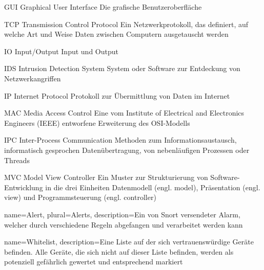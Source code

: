
	{GUI}
	{Graphical User Interface}
	{Die grafische Benutzeroberfläche}

	{TCP}
	{Transmission Control Protocol}
	{Ein Netzwerkprotokoll, das definiert, auf welche Art und Weise Daten zwischen Computern ausgetauscht werden}


	{IO}
	{Input/Output}
	{Input und Output}


	{IDS}
	{Intrusion Detection System}
	{System oder Software zur Entdeckung von Netzwerkangriffen}


	{IP}
	{Internet Protocol}
	{Protokoll zur Übermittlung von Daten im Internet}


	{MAC}
	{Media Access Control}
	{Eine vom Institute of Electrical and Electronics Engineers (IEEE) entworfene Erweiterung des OSI-Modells}


	{IPC}
	{Inter-Process Communication}
	{Methoden zum Informationsaustausch, informatisch gesprochen Datenübertragung, von nebenläufigen Prozessen oder Threads}


	{MVC}
	{Model View Controller}
	{Ein Muster zur Strukturierung von Software-Entwicklung in die drei Einheiten Datenmodell (engl. model), Präsentation (engl. view) und Programmsteuerung (engl. controller)}


 {
  name=Alert,
  plural=Alerts,
  description={Ein von Snort versendeter Alarm, welcher durch verschiedene Regeln abgefangen und verarbeitet werden kann}
}

 {
  name=Whitelist,
  description={Eine Liste auf der sich vertrauenswürdige Geräte befinden. Alle Geräte, die sich nicht auf dieser Liste befinden, werden als potenziell gefährlich gewertet und entsprechend markiert}
}





